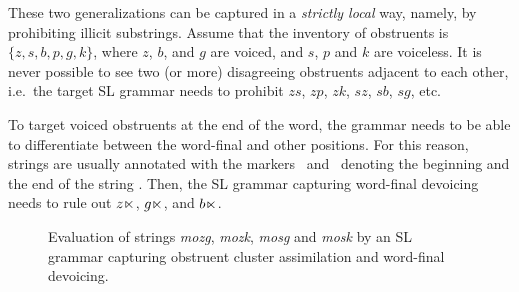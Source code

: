 These two generalizations can be captured in a \emph{strictly local} way, namely, by prohibiting illicit substrings.
Assume that the inventory of obstruents is $\{z, s, b, p, g, k\}$, where $z$, $b$, and $g$ are voiced, and $s$, $p$ and $k$ are voiceless.
It is never possible to see two (or more) disagreeing obstruents adjacent to each other, i.e.\ the target SL grammar needs to prohibit $zs$, $zp$, $zk$, $sz$, $sb$, $sg$, etc.


To target voiced obstruents at the end of the word, the grammar needs to be able to differentiate between the word-final and other positions.
For this reason, strings are usually annotated with the markers \bow\ and \eow\ denoting the beginning and the end of the string \citep{RogersPullum2011}.
Then, the SL grammar capturing word-final devoicing needs to rule out $z\ltimes$,  $g\ltimes$, and $b\ltimes$.

\begin{figure}[h!]
\begin{center}
\hspace{2em}
\vspace{1em}

\hspace{2em}
\end{center}
\caption{Evaluation of strings \emph{mozg}, \emph{mozk}, \emph{mosg} and \emph{mosk} by an SL grammar capturing obstruent cluster assimilation and word-final devoicing.}
\label{mozgi}
\end{figure}

